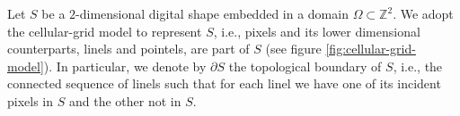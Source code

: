 Let $S$ be a $2$-dimensional digital shape embedded in a domain $\Omega \subset \mathbb{Z}^2$. We adopt the cellular-grid model to represent $S$, i.e., pixels and its lower dimensional counterparts, linels and pointels, are part of $S$ (see figure \ref{fig:cellular-grid-model}). In particular, we denote by $\partial S$ the topological boundary of $S$, i.e., the connected sequence of linels such that for each linel we have one of its incident pixels in $S$ and the other not in $S$.

\begin{figure}[]
	\center
	\hspace{40pt}%
\end{figure}

